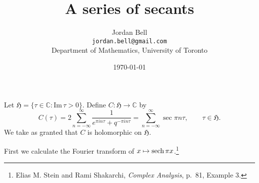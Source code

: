 \documentclass{article}
\def\Im{\ensuremath{\mathrm{Im}}\,}
\newcommand{\sech}{\ensuremath\mathrm{sech}\,}
\theoremstyle{definition}
\begin{document}
\title{A series of  secants}
\author{Jordan Bell\\ \texttt{jordan.bell@gmail.com}\\Department of Mathematics, University of Toronto}
\date{\today}

\maketitle

Let $\mathfrak{H}=\{\tau \in \mathbb{C}: \Im \tau >0\}$. Define $C:\mathfrak{H} \to \mathbb{C}$ by
\[
C(\tau) = 2 \sum_{n=-\infty}^\infty \frac{1}{e^{\pi i n\tau}+q^{-\pi i n\tau}}
=\sum_{n=-\infty}^\infty \sec \pi n \tau, \qquad \tau \in \mathfrak{H}.
\]
We take as granted that $C$ is holomorphic on $\mathfrak{H}$. 


First we calculate the Fourier transform of $x \mapsto \sech \pi x$.\footnote{Elias M. Stein and Rami Shakarchi, {\em Complex Analysis},
p.~81, Example 3.}
\end{document}
